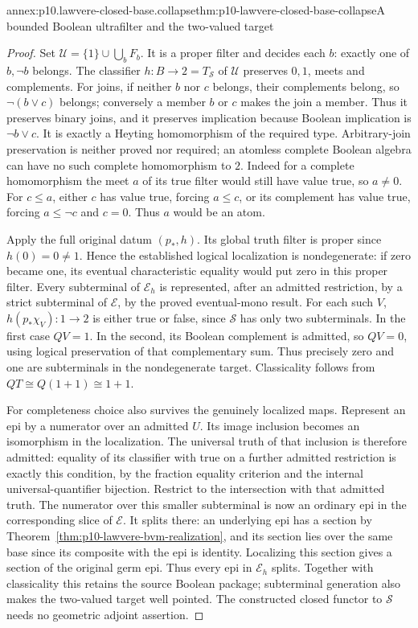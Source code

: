 \begin{annexitem}{annex:p10.lawvere-closed-base.collapse}{thm:p10-lawvere-closed-base-collapse}{A bounded Boolean ultrafilter and the two-valued target}
\begin{proof}
Set \(\mathcal U=\{1\}\cup\bigcup_bF_b\). It is a proper
filter and decides each \(b\): exactly one of \(b,\neg b\)
belongs. The classifier \(h:B\to2=T_{\mathcal S}\) of
\(\mathcal U\) preserves \(0,1\), meets and complements.
For joins, if neither \(b\) nor \(c\) belongs, their complements
belong, so \(\neg(b\vee c)\) belongs; conversely a member
\(b\) or \(c\) makes the join a member. Thus it preserves
binary joins, and it preserves implication because Boolean implication
is \(\neg b\vee c\). It is exactly a Heyting homomorphism of
the required type. Arbitrary-join preservation is neither proved nor
required; an atomless complete Boolean algebra can have no such
complete homomorphism to \(2\). Indeed for a complete homomorphism
the meet \(a\) of its true filter would still have value true,
so \(a\ne0\). For \(c\le a\), either \(c\) has value true,
forcing \(a\le c\), or its complement has value true, forcing
\(a\le\neg c\) and \(c=0\). Thus \(a\) would be an atom.

Apply the full original datum \((p_*,h)\). Its global truth filter
is proper since \(h(0)=0\ne1\). Hence the established logical
localization is nondegenerate: if zero became one, its eventual
characteristic equality would put zero in this proper filter.
Every subterminal of \(\mathcal E_h\) is represented, after an
admitted restriction, by a strict subterminal of \(\mathcal E\),
by the proved eventual-mono result. For each such \(V\),
\(h(p_*\chi_V):1\to2\) is either true or false, since
\(\mathcal S\) has only two subterminals. In the first case
\(QV=1\). In the second, its Boolean complement is admitted,
so \(QV=0\), using logical preservation of that complementary
sum. Thus precisely zero and one are subterminals in the nondegenerate
target. Classicality follows from \(QT\cong Q(1+1)\cong1+1\).

For completeness choice also survives the genuinely localized maps.
Represent an epi by a numerator over an admitted \(U\).
Its image inclusion becomes an isomorphism in the localization.
The universal truth of that inclusion is therefore admitted: equality
of its classifier with true on a further admitted restriction is
exactly this condition, by the fraction equality criterion and the
internal universal-quantifier bijection. Restrict to the intersection
with that admitted truth. The numerator over this smaller subterminal
is now an ordinary epi in the corresponding slice of \(\mathcal E\).
It splits there: an underlying epi has a section by
Theorem~\ref{thm:p10-lawvere-bvm-realization}, and its section lies over the same
base since its composite with the epi is identity. Localizing this
section gives a section of the original germ epi. Thus every epi
in \(\mathcal E_h\) splits. Together with classicality this
retains the source Boolean package; subterminal generation also makes
the two-valued target well pointed. The constructed closed functor
to \(\mathcal S\) needs no geometric adjoint assertion.


\end{proof}
\end{annexitem}
